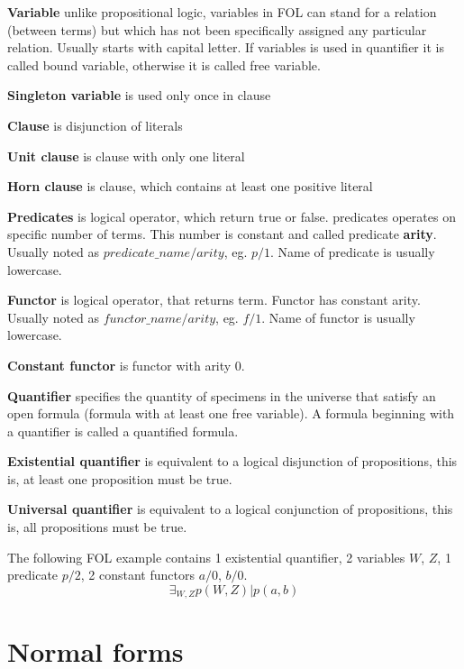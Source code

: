 \textbf{Variable}
unlike propositional logic, variables in \gls{FOL} can stand for a relation (between terms) but which has not been specifically assigned any particular relation.
Usually starts with capital letter. If variables is used in quantifier it is called bound variable, otherwise it is called free variable.

\textbf{Singleton variable}
is used only once in clause

\textbf{Clause}
is disjunction of literals

\textbf{Unit clause}
is clause with only one literal

\textbf{Horn clause}
is clause, which contains at least one positive literal

\textbf{Predicates}
is logical operator, which return true or false. predicates operates on specific number of terms. This number is constant and called predicate \textbf{arity}. Usually noted as $predicate\_name/arity$, eg. $p/1$. Name of predicate is usually lowercase.

\textbf{Functor}
is logical operator, that returns term. Functor has constant arity. Usually noted as $functor\_name/arity$, eg. $f/1$. Name of functor  is usually lowercase.

\textbf{Constant functor}
is functor with arity 0.

\textbf{Quantifier}
specifies the quantity of specimens in the universe that satisfy an open formula (formula with at least one free variable). A formula beginning with a quantifier is called a quantified formula.

\textbf{Existential quantifier}
is equivalent to a logical disjunction of propositions, this is, at least one proposition must be true.

\textbf{Universal quantifier}
is equivalent to a logical conjunction of propositions, this is, all propositions must be true.

The following \gls{FOL} example contains 1 existential quantifier, 2 variables $W$, $Z$, 1 predicate $p/2$, 2 constant functors $a/0$, $b/0$.
\begin{equation} \label{eg:FOL_1}
  \exists_{W,Z} p(W,Z) | p(a, b)
\end{equation}

\section{Normal forms}

